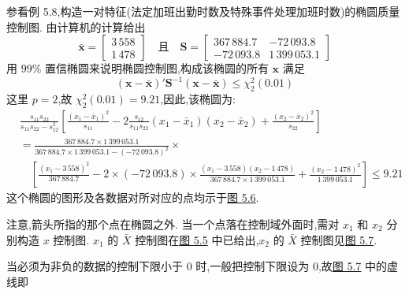 参看例 5.8,构造一对特征(法定加班出勤时数及特殊事件处理加班时数)的椭圆质量控制图. 由计算机的计算给出
\[
\bar{\mathbf{x}}=\begin{bmatrix}3\,558\\1\,478\end{bmatrix}\quad\text{且}\quad \mathbf{S}=\begin{bmatrix}367\,884.7 & -72\,093.8\\-72\,093.8 & 1\,399\,053.1\end{bmatrix}
\]
用 $99\%$ 置信椭圆来说明椭圆控制图,构成该椭圆的所有 $\mathbf{x}$ 满足
\[
(\mathbf{x}-\bar{\mathbf{x}})'\mathbf{S}^{-1}(\mathbf{x}-\bar{\mathbf{x}})\leqslant\chi_2^{2}(0.01)
\]
这里 $p=2$,故 $\chi_2^{2}(0.01)=9.21$,因此,该椭圆为:
\begin{align*}
&\frac{s_{11}s_{22}}{s_{11}s_{22}-s_{12}^{2}}\left[\frac{(x_1-\bar{x}_1)^{2}}{s_{11}}-2\frac{s_{12}}{s_{11}s_{22}}(x_1-\bar{x}_1)(x_2-\bar{x}_2)+\frac{(x_2-\bar{x}_2)^{2}}{s_{22}}\right]\\
&=\frac{367\,884.7\times1\,399\,053.1}{367\,884.7\times1\,399\,053.1-(-72\,093.8)^{2}}\times\\
&\quad\left[\frac{(x_1-3\,558)^{2}}{367\,884.7}-2\times(-72\,093.8)\times\frac{(x_1-3\,558)(x_2-1\,478)}{367\,884.7\times1\,399\,053.1}+\frac{(x_2-1\,478)^{2}}{1\,399\,053.1}\right]\leqslant9.21
\end{align*}
这个椭圆的图形及各数据对所对应的点均示于\hyperref[fig:5.6]{图 5.6}.

注意,箭头所指的那个点在椭圆之外. 当一个点落在控制域外面时,需对 $x_1$ 和 $x_2$ 分别构造 $x$ 控制图. $x_1$ 的 $\bar{X}$ 控制图在\hyperref[fig:5.5]{图 5.5} 中已给出,$x_2$ 的 $\bar{X}$ 控制图见\hyperref[fig:5.7]{图 5.7}.

当必须为非负的数据的控制下限小于 0 时,一般把控制下限设为 0,故\hyperref[fig:5.7]{图 5.7} 中的虚线即
